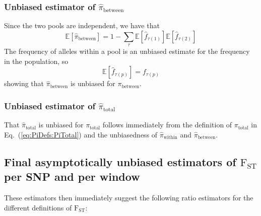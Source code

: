\documentclass[letterpaper,fontsize=9pt,DIV=12]{scrartcl}
\newcommand\eqnref[1]{Eq.~(\ref{#1})}
\newcommand{\empfreq}{\widehat{f}}
\begin{document}

\subsubsection*{Unbiased estimator of \texorpdfstring{$\widehat{\pi}_\text{between}$}{Pi Between}}
\label{supp:sec:FST:sub:EstimatorsPi:sub:PiBetween}

Since the two pools are independent, we have that
\[
\mathbb{E}\left[\widehat{\pi}_\text{between}\right] = 1- \sum_\tau \mathbb{E}\left[\empfreq_{\tau(1)}\right]\mathbb{E}\left[\empfreq_{\tau(2)}\right]
\]
The frequency of alleles within a pool is an unbiased estimate for the frequency in the population, so
\[
\mathbb{E}\left[\empfreq_{\tau(p)}\right] = f_{\tau(p)}
\]
showing that $\widehat{\pi}_\text{between}$ is unbiased for $\pi_\text{between}$.


\subsubsection*{Unbiased estimator of \texorpdfstring{$\widehat{\pi}_\text{total}$}{Pi Total}}
\label{supp:sec:FST:sub:EstimatorsPi:sub:PiTotal}

That $\widehat{\pi}_\text{total}$ is unbiased for $\pi_\text{total}$ follows immediately from the definition of $\pi_\text{total}$ in \eqnref{eq:PiDefs:PiTotal} and the unbiasedness of $\widehat{\pi}_\text{within}$ and $\widehat{\pi}_\text{between}$.


\subsection{Final asymptotically unbiased estimators of \texorpdfstring{$\text{F}_\text{ST}$}{FST} per SNP and per window}
\label{supp:sec:FST:sub:EstimatorFST}

These estimators then immediately suggest the following ratio estimators for the different definitions of $\text{F}_\text{ST}$:
\end{document}
